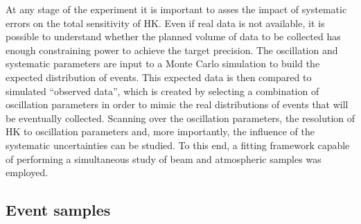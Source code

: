 At any stage of the experiment it is important to asses the impact of systematic errors on the total sensitivity of HK.
Even if real data is not available, it is possible to understand whether the planned volume of data to be collected %
has enough constraining power to achieve the target precision.
The oscillation and systematic parameters are input to a Monte Carlo simulation %
to build the expected distribution of events.
This expected data is then compared to simulated ``observed data'', which is created by selecting %
a combination of oscillation parameters in order to mimic the real distributions of events that will be eventually collected.
Scanning over the oscillation parameters, the resolution of HK to oscillation parameters and, more importantly, %
the influence of the systematic uncertainties can be studied.
To this end, a fitting framework capable of performing a simultaneous study of beam and atmospheric samples was employed. 

\subsection{Event samples}
\label{sec:event_samples}

